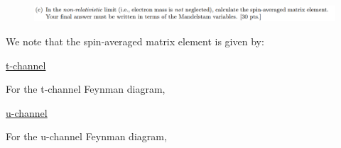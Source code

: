 \documentclass[11pt]{article}
\theoremstyle{definition}
\numberwithin{equation}{section}
\begin{document}
\begin{figure}[H]
    \centering
    \includegraphics[scale = 0.4]{2c.png}
\end{figure}

We note that the spin-averaged matrix element is given by:

\underline{t-channel}

For the t-channel Feynman diagram, 

\underline{u-channel}

For the u-channel Feynman diagram,
\end{document}
